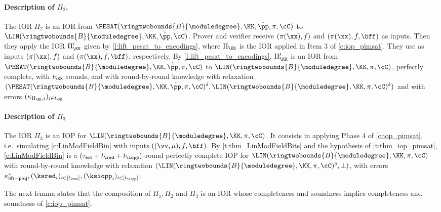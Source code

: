 \paragraph{Description of $\Pi_2$.} 
The IOR $\Pi_2$ is an IOR from $\PESAT(\ringtwobounds{B}{\moduledegree},\KK, \hat{\pp},\pi,\cC)$ to $\LIN(\ringtwobounds{B}{\moduledegree},\KK, \hat{\pp},\cC)$. Prover and verifier receive $(\pi(\xx),f)$ and $(\pi(\xx),f,\bff)$ as inputs. Then they  apply the IOR
$\Pi_\KK'$ given by \cref{l:lift_pesat_to_encodings}, where $\Pi_\KK$ is the IOR applied in Item 3 of \cref{c:iop_pimsat}. They use as inputs $(\pi(\xx),f)$ and $(\pi(\xx),f,\bff)$, respectively. By \cref{l:lift_pesat_to_encodings}, $\Pi_\KK'$ is an IOR from $\PESAT(\ringtwobounds{B}{\moduledegree},\KK, \hat{\pp},\pi, \cC)$ to $\LIN(\ringtwobounds{B}{\moduledegree},\KK,\pi,\cC)$, perfectly complete, with $t_\KK$ rounds, and with round-by-round knowledge with relaxation  $(\PESAT(\ringtwobounds{B}{\moduledegree},\KK, \hat{\pp}, \pi,\cC)^\delta,\LIN(\ringtwobounds{B}{\moduledegree},\KK,\pi,\cC)^\delta)$ and with errors $(\kappa_{\Pi_\KK,i})_{i\in t_{\KK}}$ 

\paragraph{Description of $\Pi_3$}

The IOR $\Pi_3$ is an IOP for $\LIN(\ringtwobounds{B}{\moduledegree},\KK,\pi,\cC)$. It consists  in applying Phase 4 of \cref{c:iop_pimsat}, i.e.\ simulating \cref{c:LinModFieldBin} with inputs $((\vv,\mu), f,\bff)$. By \cref{t:thm_LinModFieldBits} and the hypothesis of \cref{t:thm_iop_pimsat}, \cref{c:LinModFieldBin} is a $(\tau_{\mathsf{\mathsf{ext}}}+t_\red+t_\iopp)$-round perfectly complete IOP for $\LIN(\ringtwobounds{B}{\moduledegree},\KK,\pi,\cC)$ with round-by-round knowledge with relaxation $(\LIN(\ringtwobounds{B}{\moduledegree},\KK,\pi,\cC)^\delta,\bot)$, with errors $\kappa_{\mathsf{lift-proj}}^*, (\ksred_i)_{i\in [t_\red]}, (\ksiopp_i)_{i\in [t_\iopp]}$.


The next lemma states that the composition of $\Pi_1, \Pi_2$ and $\Pi_3$ is an IOR whose completeness and soundness implies completeness and soundness of \cref{c:iop_pimsat}.

